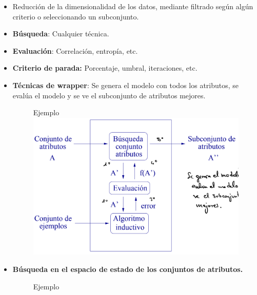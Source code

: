 \documentclass[12pt, twoside, openright]{report} %
\begin{document}
\begin{enumerate}
\begin{itemize}
\begin{itemize}
			                  \begin{itemize}
				                  \item Reducción de la dimensionalidad de los datos, mediante filtrado
				                        según algún criterio o seleccionando un subconjunto.
				                  \item \textbf{Búsqueda}: Cualquier técnica.
				                  \item \textbf{Evaluación}: Correlación, entropía, etc.
				                  \item \textbf{Criterio de parada:} Porcentaje, umbral, iteraciones,
				                        etc.
				                  \item \textbf{Técnicas de wrapper}: Se genera el modelo con todos los
				                        atributos, se evalúa el modelo y se ve el subconjunto de
				                        atributos mejores.
				                        \begin{figure}[H]
					                        Ejemplo
					                        {\includegraphics[scale=.2]{Untitled 14.png}}
				                        \end{figure}
				                        \pagebreak
				                  \item \textbf{Búsqueda en el espacio de estado de los conjuntos de
					                        atributos.}
				                        \begin{figure}[H]
					                        Ejemplo

\end{figure}
\end{itemize}
\end{itemize}
\end{itemize}
\end{enumerate}
\end{document}
